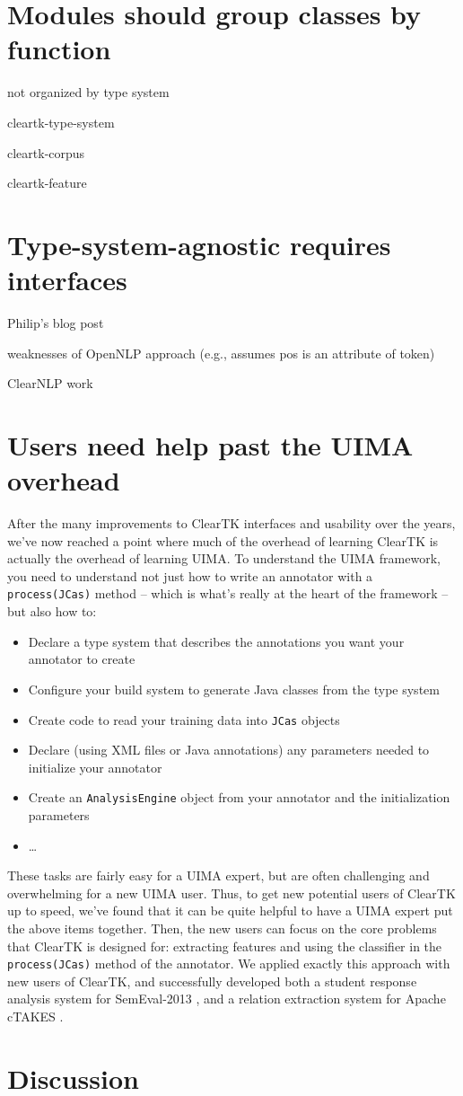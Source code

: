 \documentclass[10pt, a4paper]{article}
\newcommand{\code}[1]{\texttt{\small #1}}
\begin{document}
\section{Modules should group classes by function}
not organized by type system

cleartk-type-system

cleartk-corpus

cleartk-feature


\section{Type-system-agnostic requires interfaces}

Philip's blog post

weaknesses of OpenNLP approach (e.g., assumes pos is an attribute of token)

ClearNLP work


\section{Users need help past the UIMA overhead}
After the many improvements to ClearTK interfaces and usability over the years, we've now reached a point where much of the overhead of learning ClearTK is actually the overhead of learning UIMA.
To understand the UIMA framework, you need to understand not just how to write an annotator with a \code{process(JCas)} method -- which is what's really at the heart of the framework -- but also how to:
\begin{itemize}
\item Declare a type system that describes the annotations you want your annotator to create
\item Configure your build system to generate Java classes from the type system
\item Create code to read your training data into \code{JCas} objects
\item Declare (using XML files or Java annotations) any parameters needed to initialize your annotator
\item Create an \code{AnalysisEngine} object from your annotator and the initialization parameters
\item \ldots
\end{itemize}
These tasks are fairly easy for a UIMA expert, but are often challenging and overwhelming for a new UIMA user.
Thus, to get new potential users of ClearTK up to speed, we've found that it can be quite helpful to have a UIMA expert put the above items together.
Then, the new users can focus on the core problems that ClearTK is designed for: extracting features and using the classifier in the \code{process(JCas)} method of the annotator.
We applied exactly this approach with new users of ClearTK, and successfully developed both a student response analysis system for SemEval-2013 \cite{okoye-bethard-sumner:2013:SemEval-2013}, and a relation extraction system for Apache cTAKES \cite{dligach2013discovering}.

\section{Discussion}



\end{document}
